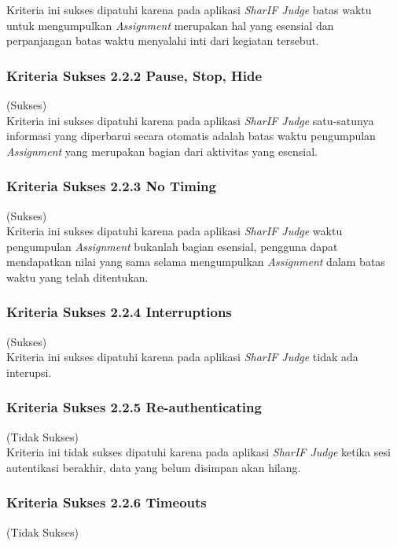 Kriteria ini sukses dipatuhi karena pada aplikasi \textit{SharIF Judge} batas waktu untuk mengumpulkan \textit{Assignment} merupakan hal yang esensial dan perpanjangan batas waktu menyalahi inti dari kegiatan tersebut.

\subsubsection{Kriteria Sukses 2.2.2 Pause, Stop, Hide}
\label{subsubsec:kepatuhan_kriteria_2.2.2}
(Sukses) \\

Kriteria ini sukses dipatuhi karena pada aplikasi \textit{SharIF Judge} satu-satunya informasi yang diperbarui secara otomatis adalah batas waktu pengumpulan \textit{Assignment} yang merupakan bagian dari aktivitas yang esensial.

\subsubsection{Kriteria Sukses 2.2.3 No Timing}
\label{subsubsec:kepatuhan_kriteria_2.2.3}
(Sukses) \\

Kriteria ini sukses dipatuhi karena pada aplikasi \textit{SharIF Judge} waktu pengumpulan \textit{Assignment} bukanlah bagian esensial, pengguna dapat mendapatkan nilai yang sama selama mengumpulkan \textit{Assignment} dalam batas waktu yang telah ditentukan.

\subsubsection{Kriteria Sukses 2.2.4 Interruptions}
\label{subsubsec:kepatuhan_kriteria_2.2.4}
(Sukses) \\

Kriteria ini sukses dipatuhi karena pada aplikasi \textit{SharIF Judge} tidak ada interupsi.

\subsubsection{Kriteria Sukses 2.2.5 Re-authenticating}
\label{subsubsec:kepatuhan_kriteria_2.2.5}
(Tidak Sukses) \\

Kriteria ini tidak sukses dipatuhi karena pada aplikasi \textit{SharIF Judge} ketika sesi autentikasi berakhir, data yang belum disimpan akan hilang.

\subsubsection{Kriteria Sukses 2.2.6 Timeouts}
\label{subsubsec:kepatuhan_kriteria_2.2.6}
(Tidak Sukses) \\

